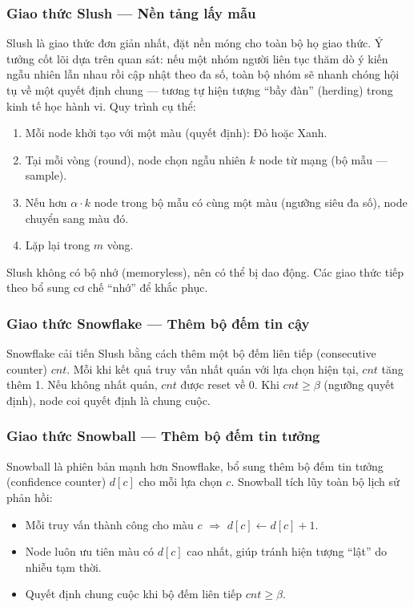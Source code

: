 \subsubsection{Giao thức Slush --- Nền tảng lấy mẫu}

Slush là giao thức đơn giản nhất, đặt nền móng cho toàn bộ họ giao thức. Ý tưởng cốt lõi dựa trên quan sát: nếu một nhóm người liên tục thăm dò ý kiến ngẫu nhiên lẫn nhau rồi cập nhật theo đa số, toàn bộ nhóm sẽ nhanh chóng hội tụ về một quyết định chung --- tương tự hiện tượng ``bầy đàn'' (herding) trong kinh tế học hành vi. Quy trình cụ thể:

\begin{enumerate}
    \item Mỗi node khởi tạo với một màu (quyết định): Đỏ hoặc Xanh.
    \item Tại mỗi vòng (round), node chọn ngẫu nhiên $k$ node từ mạng (bộ mẫu --- sample).
    \item Nếu hơn $\alpha \cdot k$ node trong bộ mẫu có cùng một màu (ngưỡng siêu đa số), node chuyển sang màu đó.
    \item Lặp lại trong $m$ vòng.
\end{enumerate}

Slush không có bộ nhớ (memoryless), nên có thể bị dao động. Các giao thức tiếp theo bổ sung cơ chế ``nhớ'' để khắc phục.

\subsubsection{Giao thức Snowflake --- Thêm bộ đếm tin cậy}

Snowflake cải tiến Slush bằng cách thêm một bộ đếm liên tiếp (consecutive counter) $cnt$. Mỗi khi kết quả truy vấn nhất quán với lựa chọn hiện tại, $cnt$ tăng thêm 1. Nếu không nhất quán, $cnt$ được reset về 0. Khi $cnt \geq \beta$ (ngưỡng quyết định), node coi quyết định là chung cuộc.

\subsubsection{Giao thức Snowball --- Thêm bộ đếm tin tưởng}

Snowball là phiên bản mạnh hơn Snowflake, bổ sung thêm bộ đếm tin tưởng (confidence counter) $d[c]$ cho mỗi lựa chọn $c$. Snowball tích lũy toàn bộ lịch sử phản hồi:

\begin{itemize}
    \item Mỗi truy vấn thành công cho màu $c$ $\Rightarrow$ $d[c] \leftarrow d[c] + 1$.
    \item Node luôn ưu tiên màu có $d[c]$ cao nhất, giúp tránh hiện tượng ``lật'' do nhiễu tạm thời.
    \item Quyết định chung cuộc khi bộ đếm liên tiếp $cnt \geq \beta$.
\end{itemize}

